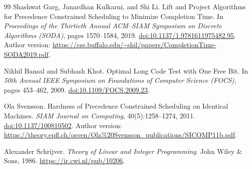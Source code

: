 \begin{thebibliography}{99}
Shashwat Garg, Janardhan Kulkarni, and Shi Li.
\newblock Lift and Project Algorithms for Precedence Constrained
Scheduling to Minimize Completion Time.
\newblock In \emph{Proceedings of the Thirtieth Annual ACM--SIAM
Symposium on Discrete Algorithms (SODA)}, pages 1570--1584, 2019.
\newblock \href{https://doi.org/10.1137/1.9781611975482.95}
{doi:10.1137/1.9781611975482.95}.
\newblock Author version:
\url{https://cse.buffalo.edu/~shil/papers/CompletionTime-SODA2019.pdf}.

Nikhil Bansal and Subhash Khot.
\newblock Optimal Long Code Test with One Free Bit.
\newblock In \emph{50th Annual IEEE Symposium on Foundations of Computer
Science (FOCS)}, pages 453--462, 2009.
\newblock \href{https://doi.org/10.1109/FOCS.2009.23}
{doi:10.1109/FOCS.2009.23}.

Ola Svensson.
\newblock Hardness of Precedence Constrained Scheduling on Identical Machines.
\newblock \emph{SIAM Journal on Computing}, 40(5):1258--1274, 2011.
\newblock \href{https://doi.org/10.1137/100810502}
{doi:10.1137/100810502}.
\newblock Author version:
\url{https://theory.epfl.ch/osven/Ola%20Svensson_publications/SICOMP11b.pdf}.

Alexander Schrijver.
\newblock \emph{Theory of Linear and Integer Programming}.
\newblock John Wiley \& Sons, 1986.
\newblock \url{https://ir.cwi.nl/pub/10206}.

\end{thebibliography}


